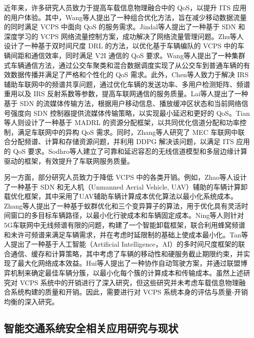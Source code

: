 近年来，许多研究人员致力于提高车载信息物理融合中的 QoS，以提升 ITS 应用的用户体验。其中，Wang等人\cite{wang2016offloading}提出了一种组合优化方法，旨在减少移动数据流量的同时满足 VCPS 中面向 QoS 的服务需求。Jindal等人\cite{jindal2018sedative}提出了一种基于 SDN 和深度学习的 VCPS 网络流量控制方案，成功解决了网络流量管理问题。Zhu等人\cite{zhu2022joint}设计了一种基于双时间尺度 DRL 的方法，以优化基于车辆编队的 VCPS 中的车辆间距和通信效率，同时满足 V2I 通信的 QoS 要求。Wang等人\cite{wang2023a}提出了一种集群式车辆通信方法，通过公交车聚类和混合数据调度实现了从公交车到普通车辆的有效数据传播并满足了严格和个性化的 QoS 需求。此外，Chen等人\cite{chen2021qos}致力于解决 IRS 辅助车联网中的频谱共享问题，通过优化车辆的发送功率、多用户检测矩阵、频谱重用以及 IRS 反射系数等参数，提高车联网通信的服务质量。Lai等人\cite{lai2017a}提出了一种基于 SDN 的流媒体传输方法，根据用户移动信息、播放缓冲区状态和当前网络信号强度向 SDN 控制器提供流媒体传输策略，以实现最小延迟和更好的 QoS。Tian等人\cite{tian2022multiagent}则设计了一种基于 MADRL 的资源分配框架，以共同优化信道分配和功率控制，满足车联网中的异构 QoS 需求。同时，Zhang等人\cite{zhang2020hierarchical}研究了 MEC 车联网中联合分配频谱、计算和存储资源问题，并利用 DDPG 解决该问题，以满足 ITS 应用的 QoS 要求。Sodhro等人\cite{sodhro2020ai}建立了可靠和延迟容忍的无线信道模型和多层边缘计算驱动的框架，有效提升了车联网服务质量。

另一方面，部分研究人员致力于降低 VCPS 中的各类开销。例如，Zhao等人\cite{zhao2021a}设计了一种基于 SDN 和无人机（Unmanned Aerial Vehicle, UAV）辅助的车辆计算卸载优化框架，其中采用了UAV辅助车辆计算成本优化算法以最小化系统成本。Zhang等人\cite{zhang2019hybrid}提出了一种基于蚁群优化和三个变异算子的算法，用于优化具有灵活时间窗口的多目标车辆路径，以最小化行驶成本和车辆固定成本。Ning等人\cite{ning2020when}则针对5G车联网中无线频谱有限的问题，构建了一个智能卸载框架，联合利用蜂窝频谱和未许可频谱来满足车辆需求，并在考虑时延限制的基础上使成本最小化。Tan等人\cite{tan2019twin}提出了一种基于人工智能（Artificial Intelligence，AI）的多时间尺度框架的联合通信、缓存和计算策略，其中考虑了车辆的移动性和硬服务截止期限约束，并实现了最大化网络成本效益。Hui等人\cite{hui2022collaboration}提出了一种协作自动驾驶方案，并通过联盟博弈机制来确定最佳车辆分簇，以最小化每个簇的计算成本和传输成本。虽然上述研究对 VCPS 系统中的开销进行了深入研究，但这些研究并未考虑车载信息物理融合系统构建的质量和开销。因此，需要进行对 VCPS 系统本身的评估与质量-开销均衡的深入研究。

\subsection{智能交通系统安全相关应用研究与现状}

